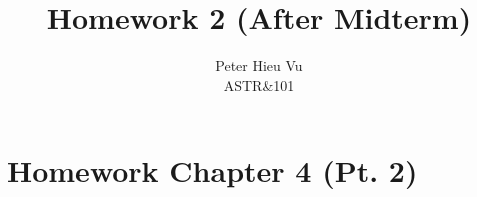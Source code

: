 \documentclass[12pt]{article}
\title{\vspace{-1.5cm}Homework 2 (After Midterm)}
\author{Peter Hieu Vu\\ASTR\&101}
\newcommand\onlyinsubfile[1]{#1}
\newcommand\notinsubfile[1]{}
\begin{document}
\renewcommand{\onlyinsubfile}[1]{}
\renewcommand{\notinsubfile}[1]{#1}

\maketitle

\section{Homework Chapter 4 (Pt. 2)}

\end{document}
